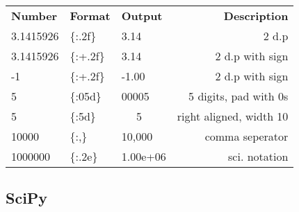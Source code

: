 \documentclass[10pt]{extarticle}
\begin{document}
\begin{multicols}{3}
\begin{tabular}{lllr}
{\bf Number} & {\bf Format} & {\bf Output} & {\bf Description} \\
3.1415926 & \{:.2f\} & 3.14 & 2 d.p \\
3.1415926 & \{:+.2f\} & 3.14 & 2 d.p with sign \\
-1 & \{:+.2f\} & -1.00 & 2 d.p with sign \\
5 & \{:05d\} & 00005 & 5 digits, pad with 0s \\
5 & \{:5d\} & \,\,\,\,\,\,\,\,5 & right aligned, width 10 \\
10000 & \{:,\} & 10,000 & comma seperator \\
1000000 & \{:.2e\} & 1.00e+06 & sci. notation \\
\end{tabular}

\subsection*{SciPy}


\end{multicols}
\end{document}
